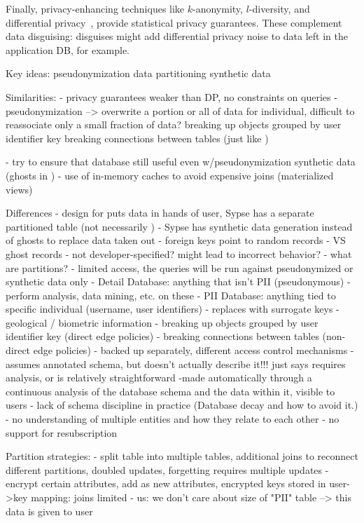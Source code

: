 %
Finally, privacy-enhancing techniques like $k$-anonymity, $l$-diversity, and
differential privacy~\cite{dataminingmodels, differential}, provide statistical privacy
guarantees.
%
These complement data disguising: disguises might add differential privacy noise to
data left in the application DB, for example.
%



\iffalse
Key ideas:
    pseudonymization
    data partitioning
    synthetic data

Similarities:
- privacy guarantees weaker than DP, no constraints on queries
- pseudonymization --> overwrite a portion or all of data for individual, difficult to reassociate
    only a small fraction of data?
    breaking up objects grouped by user identifier key
    breaking connections between tables (just like )

- try to ensure that database still useful even w/pseudonymization
    synthetic data (ghosts in \name)
- use of in-memory caches to avoid expensive joins (materialized views)

Differences
- design for \name puts data in hands of user, Sypse has a separate partitioned table (not
necessarily )
- Sypse has synthetic data generation instead of ghosts to replace data taken out
    - foreign keys point to random records
    - VS ghost records
    - not developer-specified? might lead to incorrect behavior?
- what are partitions?
    - limited access, the queries will be run against pseudonymized or synthetic data only
    - Detail Database: anything that isn't PII (pseudonymous)
        - perform analysis, data mining, etc. on these
    - PII Database: anything tied to specific individual (username, user identifiers)
        - replaces with surrogate keys
        - geological / biometric information
        - breaking up objects grouped by user identifier key (direct edge policies)
        - breaking connections between tables (non-direct edge policies)
    - backed up separately, different access control mechanisms
- assumes annotated schema, but doesn't actually describe it!!! just says requires analysis, or is
relatively straightforward
    -made automatically through a continuous analysis of the database schema and the data within it,
    visible to users
    - lack of schema discipline in practice (Database decay and how to avoid it.)
    - no understanding of multiple entities and how they relate to each other
- no support for resubscription

Partition strategies:
- split table into multiple tables, additional joins to reconnect different partitions, doubled updates, forgetting requires multiple
updates
- encrypt certain attributes, add as new attributes, encrypted keys stored in user->key mapping: joins limited
- us: we don't care about size of "PII" table --> this data is given to user

